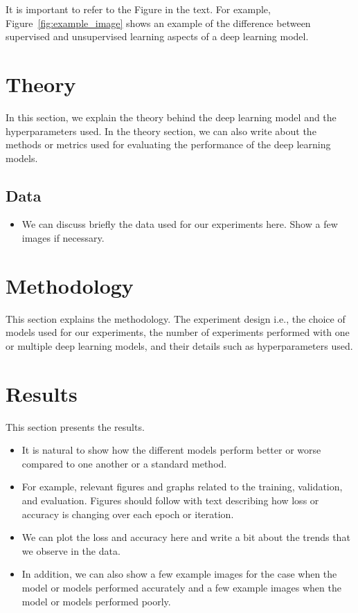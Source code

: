 \documentclass[conference]{IEEEtran}
\begin{document}
It is important to refer to the Figure in the text. For example, Figure~\ref{fig:example_image} shows an example of the difference between supervised and unsupervised learning aspects of a deep learning model.

\section{Theory}
In this section, we explain the theory behind the deep learning model and the hyperparameters used. In the theory section, we can also write about the methods or metrics used for evaluating the performance of the deep learning models.

\subsection{Data}
\begin{itemize}
    \item We can discuss briefly the data used for our experiments here. Show a few images if necessary.
\end{itemize}

\section{Methodology}
This section explains the methodology.
The experiment design i.e., the choice of models used for our experiments, the number of experiments performed with one or multiple deep learning models, and their details such as hyperparameters used. 



\section{Results}
This section presents the results.

\begin{itemize}
    \item It is natural to show how the different models perform better or worse compared to one another or a standard method.
    \item For example, relevant figures and graphs related to the training, validation, and evaluation. Figures should follow with text describing how loss or accuracy is changing over each epoch or iteration.
    \item We can plot the loss and accuracy here and write a bit about the trends that we observe in the data.
    \item In addition, we can also show a few example images for the case when the model or models performed accurately and a few example images when the model or models performed poorly.


\end{itemize}
\end{document}

